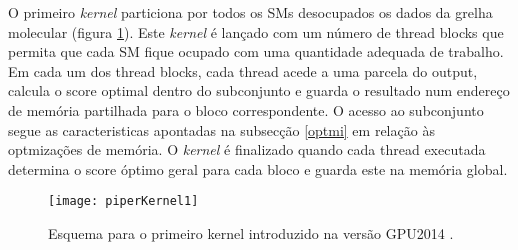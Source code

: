 O primeiro \textit{kernel} particiona por todos os SMs desocupados os dados da grelha molecular (figura \ref{k1piper}). Este \textit{kernel} é lançado com um número de thread blocks que permita que cada SM fique ocupado com uma quantidade adequada de trabalho. Em cada um dos thread blocks, cada thread acede a uma parcela do output, calcula o score optimal dentro do subconjunto e guarda o resultado num endereço de memória partilhada para o bloco correspondente. O acesso ao subconjunto segue as caracteristicas apontadas na subsecção \ref{optmi} em relação às optmizações de memória.  O \textit{kernel} é finalizado quando cada thread executada determina o score óptimo geral para cada bloco e guarda este na memória global. \par
\begin{figure}[ht]
  \centering
    {\texttt{[image: piperKernel1]}}
  \caption{Esquema para o primeiro kernel introduzido na versão GPU2014 \cite{piper2014gpu}. }
  \label{k1piper}
\end{figure}

